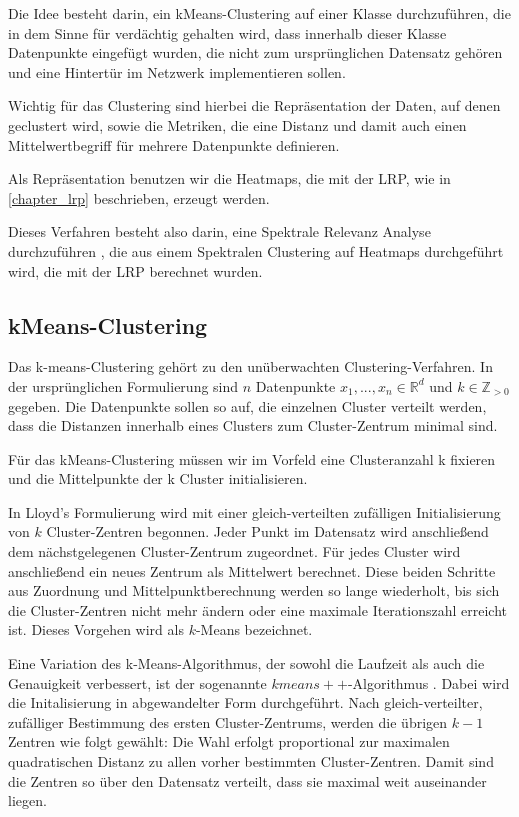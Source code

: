 \documentclass[11pt,a4paper]{article}
\numberwithin{equation}{section}
\begin{document}
Die Idee besteht darin, ein kMeans-Clustering auf einer Klasse durchzuführen, die in dem Sinne für verdächtig gehalten wird, dass innerhalb dieser Klasse Datenpunkte eingefügt wurden, die nicht zum ursprünglichen Datensatz gehören und eine Hintertür im Netzwerk implementieren sollen.

Wichtig für das Clustering sind hierbei die Repräsentation der Daten, auf denen geclustert wird, sowie die Metriken, die eine Distanz und damit auch einen Mittelwertbegriff für mehrere Datenpunkte definieren.

Als Repräsentation benutzen wir die Heatmaps, die mit der LRP, wie in \autoref{chapter_lrp} beschrieben, erzeugt werden.

Dieses Verfahren besteht also darin, eine Spektrale Relevanz Analyse durchzuführen \cite{unmaskingCH}, die aus einem Spektralen Clustering auf Heatmaps durchgeführt wird, die mit der LRP berechnet wurden.
	\subsection{kMeans-Clustering}
	Das k-means-Clustering gehört zu den unüberwachten Clustering-Verfahren. In der ursprünglichen Formulierung sind $n$ Datenpunkte $x_1,...,x_n \in \mathbb{R}^d$ und $k \in \mathbb{Z}_{>0}$ gegeben. Die Datenpunkte sollen so auf, die einzelnen Cluster verteilt werden, dass die Distanzen innerhalb eines Clusters zum Cluster-Zentrum minimal sind. 
	
	Für das kMeans-Clustering müssen wir im Vorfeld eine Clusteranzahl k fixieren und die Mittelpunkte der k Cluster initialisieren.
	
	In Lloyd's Formulierung \cite{lloyd1982least} wird mit einer gleich-verteilten zufälligen Initialisierung von $k$ Cluster-Zentren begonnen. Jeder Punkt im Datensatz wird anschließend dem nächstgelegenen Cluster-Zentrum zugeordnet. Für jedes Cluster wird anschließend ein neues Zentrum als Mittelwert berechnet.
	Diese beiden Schritte aus Zuordnung und Mittelpunktberechnung werden so lange wiederholt, bis sich die Cluster-Zentren nicht mehr ändern oder eine maximale Iterationszahl erreicht ist. Dieses Vorgehen wird als $k$-Means bezeichnet.
	
	Eine Variation des k-Means-Algorithmus, der sowohl die Laufzeit als auch die Genauigkeit verbessert, ist der sogenannte $kmeans++$-Algorithmus \cite{kmeans++}. Dabei wird die Initalisierung in abgewandelter Form durchgeführt. Nach gleich-verteilter, zufälliger Bestimmung des ersten Cluster-Zentrums, werden die übrigen $k-1$ Zentren wie folgt gewählt:
	Die Wahl erfolgt proportional zur maximalen quadratischen Distanz zu allen vorher bestimmten Cluster-Zentren. Damit sind die Zentren so über den Datensatz verteilt, dass sie maximal weit auseinander liegen.
	
\end{document}
